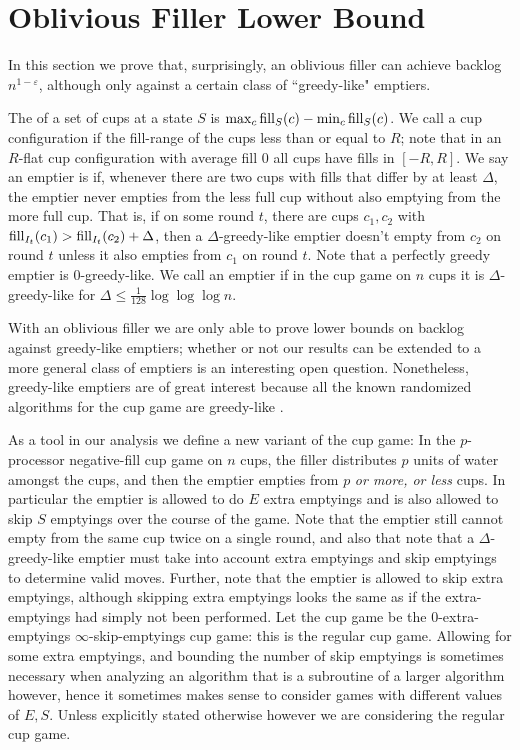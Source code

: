 \section{Oblivious Filler Lower Bound}\label{sec:oblivious}
In this section we prove that, surprisingly, an oblivious filler
can achieve backlog $n^{1-\varepsilon}$, although only against a
certain class of ``greedy-like" emptiers.

The  of a set of cups at a state $S$ is $\max_c
\operatorname{\text{\textup{fill}}}_S(c) - \min_c \operatorname{\text{\textup{fill}}}_S(c)$. We call a cup configuration
 if the fill-range of the cups less than or equal to
$R$; note that in an $R$-flat cup configuration with average fill
$0$ all cups have fills in $[-R, R]$. We say an emptier is
 if, whenever there are two cups with
fills that differ by at least $\Delta$, the emptier never empties
from the less full cup without also emptying from the more full
cup. That is, if on some round $t$, there are cups $c_1, c_2$
with $\operatorname{\text{\textup{fill}}}_{I_t}(c_1) > \operatorname{\text{\textup{fill}}}_{I_t}(c_2) + \Delta$, then a
$\Delta$-greedy-like emptier doesn't empty from $c_2$ on round
$t$ unless it also empties from $c_1$ on round $t$. Note that a
perfectly greedy emptier is $0$-greedy-like. We call an emptier
 if in the cup game on $n$ cups it is
$\Delta$-greedy-like for $\Delta \le \frac{1}{128} \log\log\log n$. 

With an oblivious filler we are only able to prove lower bounds
on backlog against greedy-like emptiers; whether or not our
results can be extended to a more general class of emptiers is an
interesting open question. Nonetheless, greedy-like emptiers are
of great interest because all the known randomized algorithms for
the cup game are greedy-like \cite{BenderFaKu19, Kuszmaul20}.

As a tool in our analysis we define a new variant of the cup
game: In the $p$-processor 
 negative-fill cup game on $n$ cups, the
filler distributes $p$ units of water amongst the cups, and then
the emptier empties from $p$ \textit{or more, or less} cups. In
particular the emptier is allowed to do $E$ extra emptyings and
is also allowed to skip $S$ emptyings over the course of the
game. Note that the emptier still cannot empty from the same cup
twice on a single round, and also that note that a
$\Delta$-greedy-like emptier must take into account extra
emptyings and skip emptyings to determine valid moves. Further,
note that the emptier is allowed to skip extra emptyings,
although skipping extra emptyings looks the same as if the
extra-emptyings had simply not been performed. 
Let the  cup game be the $0$-extra-emptyings
$\infty$-skip-emptyings cup game: this is the regular cup game.
Allowing for some extra emptyings, and bounding the number of
skip emptyings is sometimes necessary when analyzing an algorithm
that is a subroutine of a larger algorithm however, hence it
sometimes makes sense to consider games with different values of
$E,S$. Unless explicitly stated otherwise however we are
considering the regular cup game.

